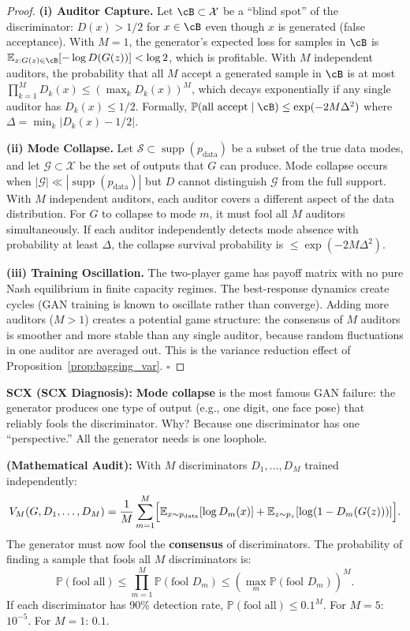 \documentclass[12pt,a4paper]{article}
\theoremstyle{definition}
\DeclareMathOperator{\supp}{supp}
\newcommand{\E}{\mathbb{E}}
\newcommand{\Pbb}{\mathbb{P}}
\newcommand{\cG}{\mathcal{G}}
\newcommand{\cS}{\mathcal{S}}
\newcommand{\cX}{\mathcal{X}}
\newcommand{\diagnosis}{\noindent\textbf{SCX (SCX Diagnosis):} }
\newcommand{\mathAudit}{\noindent\textbf{ (Mathematical Audit):} }
\begin{document}
\begin{proof}
\textbf{(i) Auditor Capture.} Let $\cB \subset \cX$ be a ``blind spot'' of the discriminator: $D(x) > 1/2$ for $x \in \cB$ even though $x$ is generated (false acceptance). With $M=1$, the generator's expected loss for samples in $\cB$ is $\E_{z: G(z) \in \cB}[-\log D(G(z))] < \log 2$, which is profitable. With $M$ independent auditors, the probability that all $M$ accept a generated sample in $\cB$ is at most $\prod_{k=1}^M D_k(x) \le (\max_k D_k(x))^M$, which decays exponentially if any single auditor has $D_k(x) \le 1/2$. Formally, $\Pbb(\text{all accept} \mid \cB) \le \exp(-2M\Delta^2)$ where $\Delta = \min_k |D_k(x) - 1/2|$.

\textbf{(ii) Mode Collapse.} Let $\cS \subset \supp(p_{\text{data}})$ be a subset of the true data modes, and let $\cG \subset \cX$ be the set of outputs that $G$ can produce. Mode collapse occurs when $|\cG| \ll |\supp(p_{\text{data}})|$ but $D$ cannot distinguish $\cG$ from the full support. With $M$ independent auditors, each auditor covers a different aspect of the data distribution. For $G$ to collapse to mode $m$, it must fool all $M$ auditors simultaneously. If each auditor independently detects mode absence with probability at least $\Delta$, the collapse survival probability is $\le \exp(-2M\Delta^2)$.

\textbf{(iii) Training Oscillation.} The two-player game has payoff matrix with no pure Nash equilibrium in finite capacity regimes. The best-response dynamics create cycles (GAN training is known to oscillate rather than converge). Adding more auditors ($M>1$) creates a potential game structure: the consensus of $M$ auditors is smoother and more stable than any single auditor, because random fluctuations in one auditor are averaged out. This is the variance reduction effect of Proposition~\ref{prop:bagging_var}. \hfill $\square$
\end{proof}

\diagnosis{} \textbf{Mode collapse} is the most famous GAN failure: the generator produces one type of output (e.g., one digit, one face pose) that reliably fools the discriminator. Why? Because one discriminator has one ``perspective.'' All the generator needs is one loophole.

\mathAudit{} With $M$ discriminators $D_1, \ldots, D_M$ trained independently:
\[
V_M(G, D_1, \ldots, D_M) = \frac{1}{M}\sum_{m=1}^M \Bigl[\E_{x \sim p_{\text{data}}}[\log D_m(x)] + \E_{z \sim p_z}[\log(1 - D_m(G(z)))]\Bigr].
\]
The generator must now fool the \textbf{consensus} of discriminators. The probability of finding a sample that fools all $M$ discriminators is:
\[
\Pbb(\text{fool all}) \le \prod_{m=1}^M \Pbb(\text{fool } D_m) \le (\max_m \Pbb(\text{fool } D_m))^M.
\]
If each discriminator has 90\% detection rate, $\Pbb(\text{fool all}) \le 0.1^M$. For $M=5$: $10^{-5}$. For $M=1$: $0.1$.
\end{document}
